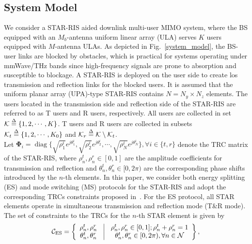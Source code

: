 \documentclass[12pt, draftclsnofoot, onecolumn]{IEEEtran}
\DeclareMathOperator{\diag}{diag}
\newcommand{\los}{\gls{los}\xspace}
\begin{document}
\subsection{System Model}
We consider a STAR-RIS aided downlink multi-user MIMO system, where the BS equipped with an $M_b$-antenna uniform linear array (ULA) serves $K$ users equipped with $M$-antenna ULAs. As depicted in Fig.~\ref{system_model}, the BS-user links are blocked by obstacles, which is practical for systems operating under mmWave/THz bands since high-frequency signals are prone to absorption and susceptible to blockage. A STAR-RIS is deployed on the user side to create \los transmission and reflection links for the blocked users. It is assumed that the uniform planar array (UPA)-type STAR-RIS contains $N=N_y \times N_z$ elements. The users located in the transmission side and reflection side of the STAR-RIS are referred to as T users and R users, respectively. All users are collected in set $\mathcal{K}\buildrel \Delta \over = \left\{1,2, \cdots, K\right\}$. T users and R users are collected in subsets $\mathcal{K}_t\buildrel \Delta \over = \left\{1,2, \cdots, K_0\right\}$ and $\mathcal{K}_r\buildrel \Delta \over = \mathcal{K}\setminus\mathcal{K}_t$. \\
\indent Let $\mathbf{\Phi}_{i}=\diag\{\sqrt{\rho_{1}^i}e^{j\theta_{1}^i}, \sqrt{\rho_{2}^i}e^{j\theta_{2}^i}, \cdots, \sqrt{\rho_{N}^i}e^{j\theta_{N}^i}\}, \forall i\in\{t,r\}$ denote the TRC matrix of the STAR-RIS, where $\rho_n^t, \rho_n^r\in[0,1]$ are the amplitude coefficients for transmission and reflection and $\theta_n^t, \theta_n^r\in[0,2\pi)$ are the corresponding phase shifts introduced by the $n$-th elements. In this paper, we consider both energy splitting (ES) and mode switching (MS) protocols for the STAR-RIS and adopt the corresponding TRCs constraints proposed in~\cite{9570143}. For the ES protocol, all STAR elements operate in simultaneous transmission and reflection mode (T\&R mode). The set of constraints to the TRCs for the $n$-th STAR element is given by
\begin{equation}
\begin{aligned}
\mathcal{C}_{\text{ES}}=\left\{ {\begin{array}{*{20}{c}}
{\rho _n^t,\rho _n^r}&\vline& {\rho _n^t,\rho _n^r \in [0,1];\rho _n^t + \rho _n^r = 1}\\
{\theta _n^t,\theta _n^r}&\vline& {\theta _n^t,\theta _n^r \in [0,2\pi ), \forall n\in\mathcal{N}}
\end{array}} \right\},
\end{aligned}
\end{equation}
\end{document}
